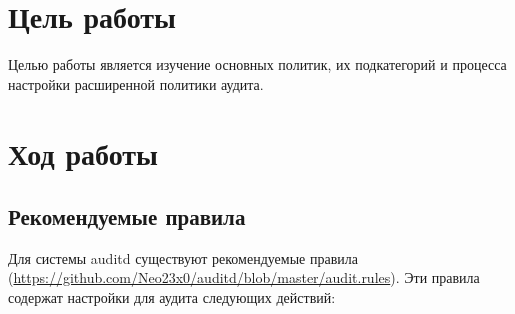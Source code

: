 \section{Цель работы}
Целью работы является изучение основных политик, их подкатегорий и процесса настройки
расширенной политики аудита.

\section{Ход работы}
\subsection{Рекомендуемые правила}

Для системы auditd существуют рекомендуемые правила (\url{https://github.com/Neo23x0/auditd/blob/master/audit.rules}). Эти правила содержат настройки для аудита следующих действий:

